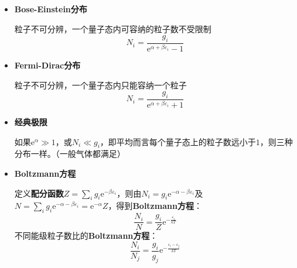 \documentclass{beamer}
\renewcommand\epsilon{\varepsilon}
\newenvironment{slide}{
    \begin{frame}{\bfseries{\sectiontitle}}
}{
    \end{frame}
}
\begin{document}
\begin{slide}
    \begin{itemize}
        \item \textbf{Bose-Einstein分布}

        粒子不可分辨，一个量子态内可容纳的粒子数不受限制
        \[
            \boxed{
            N_i = \frac{g_i}{\mathrm{e}^{\alpha+\beta\epsilon_i}-1}
            }
        \]
        \item \textbf{Fermi-Dirac分布}

        粒子不可分辨，一个量子态内只能容纳一个粒子
        \[
            \boxed{
            N_i = \frac{g_i}{\mathrm{e}^{\alpha+\beta\epsilon_i}+1}
            }
        \]
        \item \textbf{经典极限}

        如果$\mathrm{e}^{\alpha}\gg1$，或$N_i\ll g_i$，即平均而言每个量子态上的粒子数远小于$1$，则三种分布一样。（一般气体都满足）
    \end{itemize}
\end{slide}

\begin{slide}
    \begin{itemize}
        \item \textbf{Boltzmann方程}

        定义\textbf{配分函数}$Z=\sum\limits_i g_i\mathrm{e}^{-\beta\epsilon_i}$，则由$N_i=g_i\mathrm{e}^{-\alpha-\beta\epsilon_i}$及$N=\sum\limits_i g_i\mathrm{e}^{-\alpha-\beta\epsilon_i}=\mathrm{e}^{-\alpha}Z$，得到\textbf{Boltzmann方程}：
        \[
            \boxed{
            \frac{N_i}{N} = \frac{g_i}{Z}\mathrm{e}^{-\tfrac{\epsilon_i}{kT}}
            }
        \]
        不同能级粒子数比的\textbf{Boltzmann方程}：
        \[
            \boxed{
            \frac{N_i}{N_j} = \frac{g_i}{g_j}\mathrm{e}^{-\tfrac{\epsilon_i-\epsilon_j}{kT}}
            }
        \]
    \end{itemize}
\end{slide}
\end{document}
